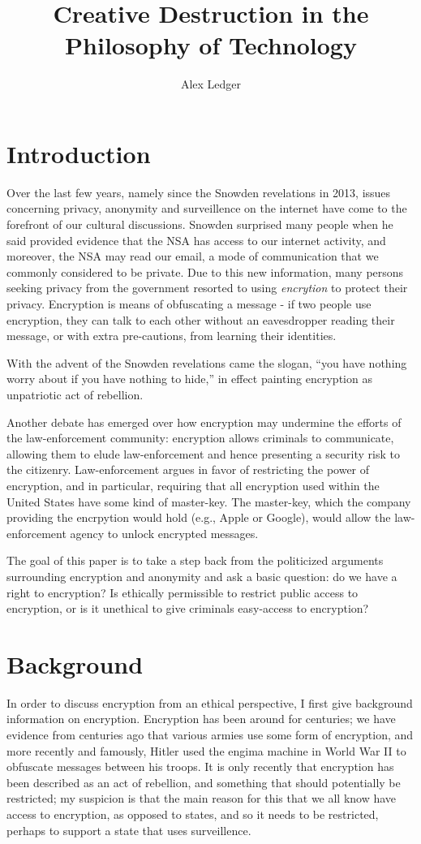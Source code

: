 \documentclass[11pt]{article}
\title{Creative Destruction in the Philosophy of Technology}
\author{Alex Ledger}
\date{}
\begin{document}
\maketitle

\section{Introduction}
Over the last few years, namely since the Snowden revelations in 2013, issues concerning privacy, anonymity and surveillence on the internet have come to the forefront of our cultural discussions.
Snowden surprised many people when he said provided evidence that the NSA has access to our internet activity, and moreover, the NSA may read our email, a mode of communication that we commonly considered to be private.
Due to this new information, many persons seeking privacy from the government resorted to using \textit{encrytion} to protect their privacy.
Encryption is means of obfuscating a message - if two people use encryption, they can talk to each other without an eavesdropper reading their message, or with extra pre-cautions, from learning their identities.

With the advent of the Snowden revelations came the slogan, ``you have nothing worry about if you have nothing to hide,'' in effect painting encryption as unpatriotic act of rebellion.

Another debate has emerged over how encryption may undermine the efforts of the law-enforcement community: encryption allows criminals to communicate, allowing them to elude law-enforcement and hence presenting a security risk to the citizenry.
Law-enforcement argues in favor of restricting the power of encryption, and in particular, requiring that all encryption used within the United States have some kind of master-key.
The master-key, which the company providing the encrpytion would hold (e.g., Apple or Google), would allow the law-enforcement agency to unlock encrypted messages.

The goal of this paper is to take a step back from the politicized arguments surrounding encryption and anonymity and ask a basic question: do we have a right to encryption?
Is ethically permissible to restrict public access to encryption, or is it unethical to give criminals easy-access to encryption?

\section{Background}
In order to discuss encryption from an ethical perspective, I first give background information on encryption.
Encryption has been around for centuries; we have evidence from centuries ago that various armies use some form of encryption, and more recently and famously, Hitler used the engima machine in World War II to obfuscate messages between his troops.
It is only recently that encryption has been described as an act of rebellion, and something that should potentially be restricted; my suspicion is that the main reason for this that we all know have access to encryption, as opposed to states, and so it needs to be restricted, perhaps to support a state that uses surveillence.
\end{document}
